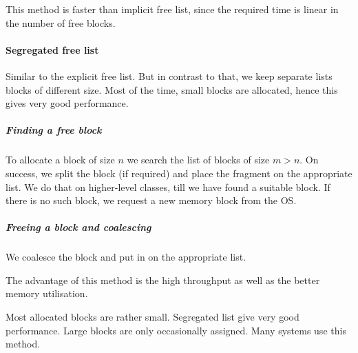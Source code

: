 This method is faster than implicit free list, since the required time is linear in the number of free blocks.

\paragraph{Segregated free list}
Similar to the explicit free list. But in contrast to that, we keep separate lists blocks of different size. Most of the time, small blocks are allocated, hence this gives very good performance.

\subparagraph{Finding a free block}
To allocate a block of size $n$ we search the list of blocks of size $m > n$. On success, we split the block (if required) and place the fragment on the appropriate list. We do that on higher-level classes, till we have found a suitable block. If there is no such block, we request a new memory block from the OS. 

\subparagraph{Freeing a block and coalescing}
We coalesce the block and put in on the appropriate list.

The advantage of this method is the high throughput as well as the better memory utilisation.

Most allocated blocks are rather small. Segregated list give very good performance. Large blocks are only occasionally assigned. Many systems use this method.
